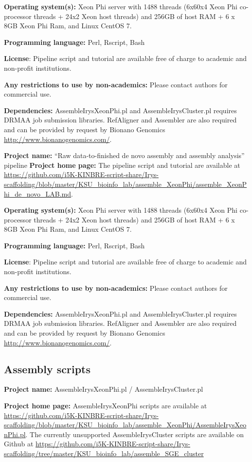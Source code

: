 \documentclass{bmcart}
\begin{document}
\textbf{Operating system(s):} Xeon Phi server with 1488 threads (6x60x4 Xeon Phi co-processor threads + 24x2 Xeon host threads) and 256GB of host RAM + 6 x 8GB Xeon Phi Ram, and Linux CentOS 7.

\textbf{Programming language:} Perl, Rscript, Bash

\textbf{License}: Pipeline script and tutorial are available free of charge to academic and non-profit institutions.

\textbf{Any restrictions to use by non-academics:} Please contact authors for commercial use.

\textbf{Dependencies:} AssembleIrysXeonPhi.pl and AssembleIrysCluster.pl requires DRMAA job submission libraries. RefAligner and Assembler are also required and can be provided by request by Bionano Genomics \url{http://www.bionanogenomics.com/}.

\textbf{Project name:} {\textquotedblleft}Raw data-to-finished de novo assembly and assembly analysis{\textquotedblright} pipeline
\textbf{Project home page:} The pipeline script and tutorial are available at \url{https://github.com/i5K-KINBRE-script-share/Irys-scaffolding/blob/master/KSU\_bioinfo\_lab/assemble\_XeonPhi/assemble\_XeonPhi\_de\_novo\_LAB.md}.

\textbf{Operating system(s):} Xeon Phi server with 1488 threads (6x60x4 Xeon Phi co-processor threads + 24x2 Xeon host threads) and 256GB of host RAM + 6 x 8GB Xeon Phi Ram, and Linux CentOS 7.

\textbf{Programming language:} Perl, Rscript, Bash

\textbf{License}: Pipeline script and tutorial are available free of charge to academic and non-profit institutions.

\textbf{Any restrictions to use by non-academics:} Please contact authors for commercial use.

\textbf{Dependencies:} AssembleIrysXeonPhi.pl and AssembleIrysCluster.pl requires DRMAA job submission libraries. RefAligner and Assembler are also required and can be provided by request by Bionano Genomics \url{http://www.bionanogenomics.com/}.


\subsection*{\textbf{Assembly scripts}}
\textbf{Project name:} AssembleIrysXeonPhi.pl / AssembleIrysCluster.pl

\textbf{Project home page:} AssembleIrysXeonPhi scripts are available at \url{https://github.com/i5K-KINBRE-script-share/Irys-scaffolding/blob/master/KSU\_bioinfo\_lab/assemble\_XeonPhi/AssembleIrysXeonPhi.pl}. The currently unsupported AssembleIrysCluster scripts are available on Github at \url{https://github.com/i5K-KINBRE-script-share/Irys-scaffolding/tree/master/KSU\_bioinfo\_lab/assemble\_SGE\_cluster}
\end{document}
